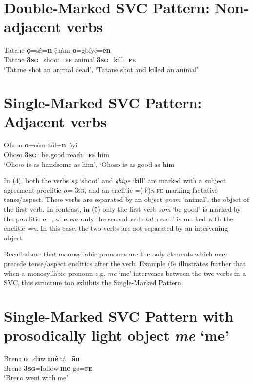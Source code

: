 \chapter[Double{}-Marked SVC Pattern: Non{}-adjacent verbs]{Double-Marked SVC Pattern: Non-adjacent verbs}
\label{bkm:Ref448077718}\label{bkm:Ref419810719}\gll Tatane  \textbf{ọ}=sá=\textbf{n}      \={e}̣nám  \textbf{o}=gbíyé=\textbf{\={e}n}\\
     Tatane  \textbf{3}\textbf{\textsc{sg}}=shoot=\textbf{\textsc{fe}}  animal  \textbf{3}\textbf{\textsc{sg}}=kill=\textbf{\textsc{fe}}\\
\glt ‘Tatane shot an animal dead’, ‘Tatane shot and killed an animal’
\z

\chapter[Single{}-Marked SVC Pattern: Adjacent verbs]{Single-Marked SVC Pattern: Adjacent verbs}
\label{bkm:Ref419810724}\gll Ohoso   \textbf{o}=sóm       túl=\textbf{n}     ọ́yi\\
     Ohoso  \textbf{3}\textbf{\textsc{sg}}=be.good    reach=\textbf{\textsc{fe}}  him\\
\glt ‘Ohoso is as handsome as him’, ‘Ohoso is as good as him’
\z

In (4), both the verbs \textit{sạ} ‘shoot’ and \textit{gbiye }‘kill’ are marked with a subject agreement proclitic \textit{o=} \textsc{3sg}, and an enclitic =(\textit{V})\textit{n} \textsc{fe} marking factative tense/aspect. These verbs are separated by an object \textit{ẹnam} ‘animal’, the object of the first verb. In contrast, in (5) only the first verb \textit{som} ‘be good’ is marked by the proclitic \textit{o=}, whereas only the second verb \textit{tul} ‘reach’ is marked with the enclitic \textit{=n}. In this case, the two verbs are not separated by an intervening object. 

Recall above that monosyllabic pronouns are the only elements which may precede tense/aspect enclitics after the verb. Example (6) illustrates further that when a monosyllabic pronoun e.g. \textit{me} ‘me’ intervenes between the two verbs in a SVC, this structure too exhibits the Single-Marked Pattern. 

\chapter[Single{}-Marked SVC Pattern with prosodically light object me ‘me’]{Single-Marked SVC Pattern with prosodically light object \textit{me} ‘me’}
\label{bkm:Ref419897124}\gll Breno  \textbf{o}=ḍúw    \textbf{mé}  tạ́=\textbf{\={a}n}\\
     Breno   \textbf{3}\textbf{\textsc{sg}}=follow   \textbf{me}  go=\textbf{\textsc{fe}}\\
\glt ‘Breno went with me’ \citep[115]{Kari2004}
\z

